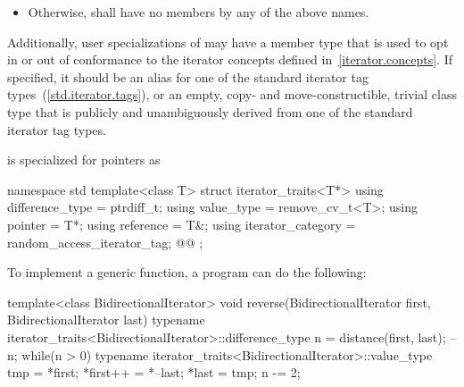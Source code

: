 \begin{itemize}

\item
Otherwise, 
shall have no members by any of the above names.
\end{itemize}

\begin{addedblock}
\pnum
Additionally, user specializations of  may have a member
type  that is used to opt in or out of conformance to the
iterator concepts defined in~\ref{iterator.concepts}. If specified, it should be
an alias for one of the standard iterator tag types~(\ref{std.iterator.tags}),
or an empty, copy- and move-constructible, trivial class type that is publicly
and unambiguously derived from one of the standard iterator tag types.
\end{addedblock}

\pnum
{} is specialized for pointers as

\begin{codeblock}
namespace std {
  template<class T> struct iterator_traits<T*> {
    using difference_type   = ptrdiff_t;
    using value_type        = remove_cv_t<T>;
    using pointer           = T*;
    using reference         = T&;
    using iterator_category = random_access_iterator_tag;
    @@
  };
}
\end{codeblock}

\pnum
\begin{example}
To implement a generic
function, a \Cpp{} program can do the following:

\begin{codeblock}
template<class BidirectionalIterator>
void reverse(BidirectionalIterator first, BidirectionalIterator last) {
  typename iterator_traits<BidirectionalIterator>::difference_type n =
    distance(first, last);
  --n;
  while(n > 0) {
    typename iterator_traits<BidirectionalIterator>::value_type
     tmp = *first;
    *first++ = *--last;
    *last = tmp;
    n -= 2;
  }
}
\end{codeblock}
\end{example}

